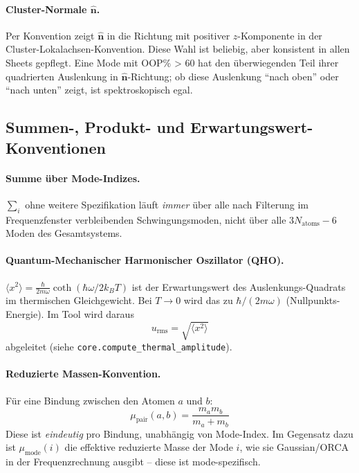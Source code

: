 \documentclass[11pt,a4paper,twoside]{article}
\theoremstyle{remark}
\begin{document}
\paragraph{Cluster-Normale $\hat{\mathbf{n}}$.}
Per Konvention zeigt $\hat{\mathbf{n}}$ in die Richtung mit positiver
$z$-Komponente in der Cluster-Lokalachsen-Konvention. Diese
Wahl ist beliebig, aber konsistent in allen Sheets gepflegt.
Eine Mode mit OOP\% > 60 hat den \"uberwiegenden Teil ihrer
quadrierten Auslenkung in $\hat{\mathbf{n}}$-Richtung; ob diese
Auslenkung "`nach oben"' oder "`nach unten"' zeigt, ist
spektroskopisch egal.

\subsection{Summen-, Produkt- und Erwartungswert-Konventionen}

\paragraph{Summe \"uber Mode-Indizes.}
$\sum_i$ ohne weitere Spezifikation l\"auft \emph{immer} \"uber alle
nach Filterung im Frequenzfenster verbleibenden Schwingungsmoden,
nicht \"uber alle $3N_\text{atoms} - 6$ Moden des
Gesamtsystems.

\paragraph{Quantum-Mechanischer Harmonischer Oszillator (QHO).}
$\langle x^2 \rangle = \frac{\hbar}{2 m \omega}\coth(\hbar\omega/2k_BT)$
ist der Erwartungswert des Auslenkungs-Quadrats im thermischen
Gleichgewicht. Bei $T \to 0$ wird das zu $\hbar/(2m\omega)$
(Nullpunkts-Energie). Im Tool wird daraus
\begin{equation}
  u_\text{rms} = \sqrt{\langle x^2\rangle}
\end{equation}
abgeleitet (siehe \texttt{core.compute\_thermal\_amplitude}).

\paragraph{Reduzierte Massen-Konvention.}
F\"ur eine Bindung zwischen den Atomen $a$ und $b$:
\begin{equation}
  \mu_\text{pair}(a, b) = \frac{m_a m_b}{m_a + m_b}
\end{equation}
Diese ist \emph{eindeutig} pro Bindung, unabh\"angig von Mode-Index.
Im Gegensatz dazu ist $\mu_\text{mode}(i)$ die effektive reduzierte
Masse der Mode $i$, wie sie Gaussian/ORCA in der Frequenzrechnung
ausgibt -- diese ist mode-spezifisch.
\end{document}
